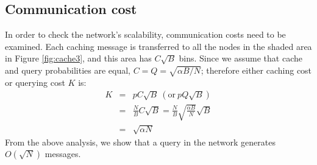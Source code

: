 \subsection{Communication cost}
In order to check the network's scalability, communication costs
need to be examined. Each caching message is transferred to all the
nodes in the shaded area in Figure \ref{fig:cache3}, and this area has
$C\sqrt{B}$ bins. Since we assume that cache and query probabilities are
equal, $C = Q = \sqrt{\alpha B/N}$; therefore either caching cost or querying cost $K$ is:
\begin{eqnarray*}\label{th}
K &=& pC\sqrt{B} \  (\mathrm{or}\  pQ\sqrt{B})\\
  &=& \frac{N}{B}C\sqrt{B} = \frac{N}{B}\sqrt{\frac{\alpha B}{N}}\sqrt{B}\\
  &=& \sqrt{\alpha N}
\end{eqnarray*}
From the above analysis, we show that a query in the network
generates $O(\sqrt{N})$ messages.

